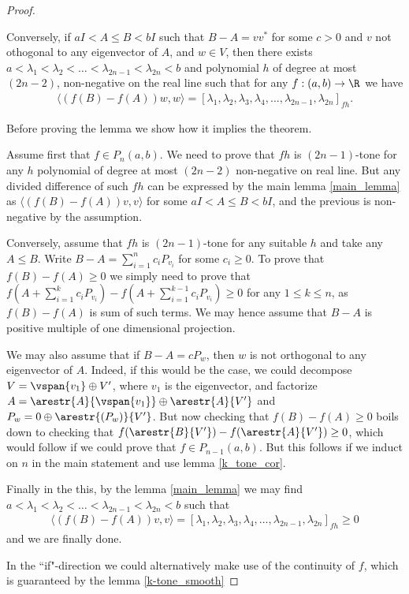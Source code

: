 \begin{proof}
\begin{lem}
		Conversely, if $a I < A \leq B < b I$ such that $B - A = v v^{*}$ for some $c > 0$ and $v$ not othogonal to any eigenvector of $A$, and $w \in V$, then there exists $a < \lambda_{1} < \lambda_{2} < \ldots < \lambda_{2 n - 1} < \lambda_{2 n} < b$ and polynomial $h$ of degree at most $(2 n - 2)$, non-negative on the real line such that for any $f : (a, b) \to \R$ we have
		\begin{align*}
			\langle (f(B) - f(A)) w, w \rangle = [\lambda_{1}, \lambda_{2}, \lambda_{3}, \lambda_{4}, \ldots, \lambda_{2n - 1}, \lambda_{2 n}]_{f h}.
		\end{align*}
	\end{lem}

	Before proving the lemma we show how it implies the theorem.

	Assume first that $f \in P_{n}(a, b)$. We need to prove that $f h$ is $(2 n - 1)$-tone for any $h$ polynomial of degree at most $(2 n - 2)$ non-negative on real line. But any divided difference of such $f h$ can be expressed by the main lemma \ref{main_lemma} as $\langle (f(B) - f(A)) v, v \rangle$ for some $aI < A \leq B < bI$, and the previous is non-negative by the assumption.

	Conversely, assume that $f h$ is $(2 n - 1)$-tone for any suitable $h$ and take any $A \leq B$. Write $B - A = \sum_{i = 1}^{n} c_{i} P_{v_{i}}$ for some $c_{i} \geq 0$. To prove that $f(B) - f(A) \geq 0$ we simply need to prove that $f(A + \sum_{i = 1}^{k} c_{i} P_{v_{i}}) - f(A + \sum_{i = 1}^{k - 1} c_{i} P_{v_{i}}) \geq 0$ for any $1 \leq k \leq n$, as $f(B) - f(A)$ is sum of such terms. We may hence assume that $B - A$ is positive multiple of one dimensional projection.

	We may also assume that if $B - A = c P_{w}$, then $w$ is not orthogonal to any eigenvector of $A$. Indeed, if this would be the case, we could decompose $V = \vspan\{v_{1}\} \oplus V'$, where $v_{1}$ is the eigenvector, and factorize $A = \arestr{A}{\vspan\{v_{1}\}} \oplus \arestr{A}{V'}$ and $P_{w} = 0 \oplus \arestr{(P_{w})}{V'}$. But now checking that $f(B) - f(A) \geq 0$ boils down to checking that $f(\arestr{B}{V'}) - f(\arestr{A}{V'}) \geq 0$, which would follow if we could prove that $f \in P_{n - 1}(a, b)$. But this follows if we induct on $n$ in the main statement and use lemma \ref{k_tone_cor}.

	Finally in the this, by the lemma \ref{main_lemma} we may find $a < \lambda_{1} < \lambda_{2} < \ldots < \lambda_{2 n - 1} < \lambda_{2 n} < b$ such that
	\begin{align*}
		\langle (f(B) - f(A)) v, v \rangle = [\lambda_{1}, \lambda_{2}, \lambda_{3}, \lambda_{4}, \ldots, \lambda_{2n - 1}, \lambda_{2 n}]_{f h} \geq 0
	\end{align*}
	and we are finally done.

	In the ``if"-direction we could alternatively make use of the continuity of $f$, which is guaranteed by the lemma \ref{k-tone_smooth}

\end{proof}

